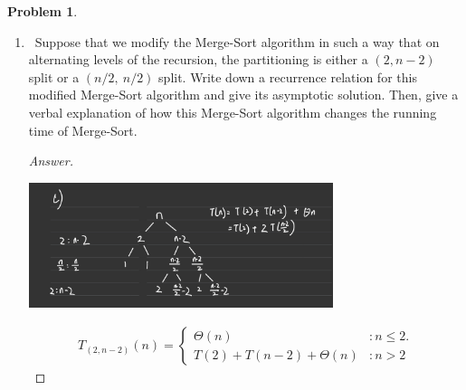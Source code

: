 \documentclass[11pt]{article}
\theoremstyle{definition}
\theoremstyle{definition}
\newtheorem{required}{Problem}
\theoremstyle{definition}
\begin{document}
\begin{required}
\begin{enumerate}[label=(\alph*)]
\begin{proof}[Answer]
\textbf{Total run time complexity:\\}
\begin{align*}
log_5 \frac{n}{5} \cdot n &= n log_5 \frac{n}{5}\\
\end{align*}

\textbf{Asymptotic Solution:\\}
\begin{align*}
\lim _{n\to \infty }\:\frac{nlog_5\left(\frac{n}{5}\right)}{nlog_5\left(n\right)} &= \lim _{n\to \infty }\:\frac{\frac{1}{ln\left(5\right)\left(\frac{n}{5}\right)}}{\frac{1}{ln\left(5\right)\left(n\right)}}\\
&= \lim _{n\to \infty }\:\frac{ln\left(5\right)n}{ln\left(5\right)\left(\frac{n}{5}\right)}\\
&= 5
\end{align*}
\textbf{This modified Merge Sort Algorithm has tight bound as $\Theta(nlog_5\left(n\right))$}
\end{proof}


\newpage

\item \label{(c)}~Suppose that we modify the Merge-Sort algorithm in such a way that on alternating levels of the recursion, the partitioning is either a $(2, n-2)$ split or a $(n/2,~n/2)$ split. Write down a recurrence relation for this modified Merge-Sort algorithm and give its asymptotic solution. Then, give a verbal explanation of how this Merge-Sort algorithm changes the running time of Merge-Sort.


\begin{proof}[Answer]
\begin{center}
\includegraphics[width=0.7\textwidth]{HW6_Q1(c).PNG}
\end{center}


\begin{align*}
T_{(2,n-2)}(n) = \begin{cases}
\Theta(n)& : n \leq 2.\\
T(2) + T(n-2) +\Theta(n)& : n > 2 
\end{cases}
\end{align*}


\end{proof}
\end{enumerate}
\end{required}
\end{document}
